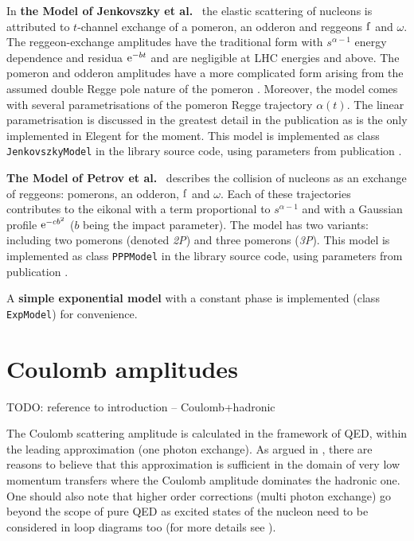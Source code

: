 \documentclass[preprint,12pt]{elsarticle}
\def\class#1{{\tt #1}}
\def\e{{\rm e}}
\begin{document}
In {\bf the Model of Jenkovszky et al.}~\cite{jenkovszky11} the elastic scattering of nucleons is attributed to $t$-channel exchange of a pomeron, an odderon and reggeons $\rm f$ and $\omega$. The reggeon-exchange amplitudes have the traditional form with $s^{\alpha - 1}$ energy dependence and residua $\e^{-bt}$ and are negligible at LHC energies and above. The pomeron and odderon amplitudes have a more complicated form arising from the assumed double Regge pole nature of the pomeron \cite[section 2]{jenkovszky86}. Moreover, the model comes with several parametrisations of the pomeron Regge trajectory $\alpha(t)$. The linear parametrisation is discussed in the greatest detail in the publication as is the only implemented in Elegent for the moment. This model is implemented as class \class{JenkovszkyModel} in the library source code, using parameters from publication \cite{jenkovszky11}.


{\bf The Model of Petrov et al.}~\cite{petrov02} describes the collision of nucleons as an exchange of reggeons: pomerons, an odderon, $\rm f$ and $\omega$. Each of these trajectories contributes to the eikonal with a term proportional to $s^{\alpha - 1}$ and with a Gaussian profile $\e^{-c b^2}$ ($b$ being the impact parameter). The model has two variants: including two pomerons (denoted {\em 2P}\/) and three pomerons ({\em 3P}\/). This model is implemented as class \class{PPPModel} in the library source code, using parameters from publication \cite{petrov02}.


A {\bf simple exponential model} with a constant phase is implemented (class \class{ExpModel}) for convenience.




\section{Coulomb amplitudes}\label{s:coul mod}

TODO: reference to introduction -- Coulomb+hadronic

The Coulomb scattering amplitude is calculated in the framework of QED, within the leading approximation (one photon exchange). As argued in \cite[section 1.3.6]{jan_thesis}, there are reasons to believe that this approximation is sufficient in the domain of very low momentum transfers where the Coulomb amplitude dominates the hadronic one. One should also note that higher order corrections (multi photon exchange) go beyond the scope of pure QED as excited states of the nucleon need to be considered in loop diagrams too (for more details see \cite{arrington07,puckett10}).
\end{document}
